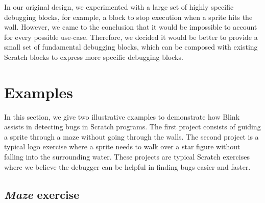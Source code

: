 \documentclass[../main]{subfiles}
\begin{document}
In our original design, we experimented with a large set of highly specific debugging blocks, for example, a block to stop execution when a sprite hits the wall.
However, we came to the conclusion that it would be impossible to account for every possible use-case.
Therefore, we decided it would be better to provide a small set of fundamental debugging blocks, which can be composed with existing Scratch blocks to express more specific debugging blocks.

\section{Examples}\label{sec:blink-illustrative-examples}

In this section, we give two illustrative examples to demonstrate how Blink assists in detecting bugs in Scratch programs.
The first project consists of guiding a sprite through a maze without going through the walls.
The second project is a typical logo exercise where a sprite needs to walk over a star figure without falling into the surrounding water.
These projects are typical Scratch exercises where we believe the debugger can be helpful in finding bugs easier and faster.

\subsection{\emph{Maze} exercise}\label{subsec:maze-exercise}
\end{document}
